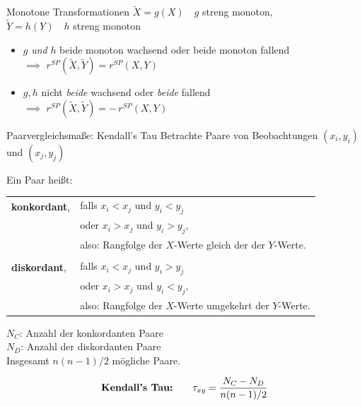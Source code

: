 \documentclass[
  10pt,
  ignorenonframetext,
]{beamer}
\providecommand{\tightlist}{%
  \setlength{\itemsep}{0pt}\setlength{\parskip}{0pt}}
\begin{document}
\begin{frame}{Monotone Transformationen}
\protect\hypertarget{monotone-transformationen}{}
\(\tilde{X} = g(X) \quad g\) streng monoton,\\
\(\tilde{Y} = h(Y) \quad h\) streng monoton

\vspace{2em}

\begin{itemize}
\tightlist
\item
  \(g\) \textit{und} \(h\) beide monoton wachsend oder beide monoton
  fallend\\
  \(\implies\) \(r^{SP}(\tilde X, \tilde Y)=r^{SP}(X,Y)\)
\item
  \(g, h\) nicht \emph{beide} wachsend oder \emph{beide} fallend\\
  \(\implies\) \(r^{SP}(\tilde X, \tilde Y)= -\, r^{SP}(X,Y)\)
\end{itemize}
\end{frame}

\begin{frame}{Paarvergleichsmaße: Kendall's Tau}
\protect\hypertarget{paarvergleichsmauxdfe-kendalls-tau}{}
Betrachte Paare von Beobachtungen \((x_i, y_i)\) und \((x_j, y_j)\)

Ein Paar heißt:

\begin{tabular}{ll}
\textbf{konkordant}, & falls $x_i < x_j$ und $y_i < y_j$ \\
& oder $x_i > x_j$ und $y_i > y_j$,\\
& also: Rangfolge der $X$-Werte gleich der der $Y$-Werte.\\
&\\
\textbf{diskordant}, & falls $x_i < x_j$ und $y_i > y_j$\\
& oder $x_i > x_j$ und $y_i < y_j,$\\
& also: Rangfolge der $X$-Werte umgekehrt der $Y$-Werte.\\
\end{tabular}

\(N_C\): Anzahl der konkordanten Paare\\
\(N_D\): Anzahl der diskordanten Paare\\
Insgesamt \(n(n-1)/2\) mögliche Paare.

\begin{equation*}
\text{\textbf{Kendall's Tau:}} \qquad  \tau_{xy} = \frac{N_C - N_D}{n(n-1)/2} 
\end{equation*}
\end{frame}
\end{document}
